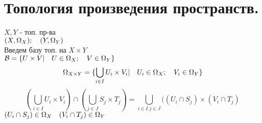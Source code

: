 \documentclass[geometry.tex]{subfiles}
\begin{document}
  \section{Топология произведения пространств.}

  \begin{example} [- конструкция]
      $X, Y$ - топ. пр-ва\\
      $(X, \Omega_X); \quad (Y, \Omega_Y)$ \\
      Введем базу топ. на $X \times Y$\\
      $\mathcal{B} = \{U \times V | \quad U \in \Omega_X; \quad V \in \Omega_Y\}$\\
      \[\Omega_{X \times Y} = \{\bigcup_{i \in I} U_i \times V_i | \quad U_i \in \Omega_X; \quad V_i \in \Omega_Y\}\]
      \[(\bigcup_{i \in I} U_i \times V_i) \cap (\bigcup_{j \in J} S_j \times T_j) =
      \bigcup_{i \in I \; j  \in J} ((U_i \cap S_j) \times (V_i \cap T_j)\]
      $(U_i \cap S_j) \in \Omega_X \quad (V_i \cap T_j) \in \Omega_Y$
  \end{example}
\end{document}
